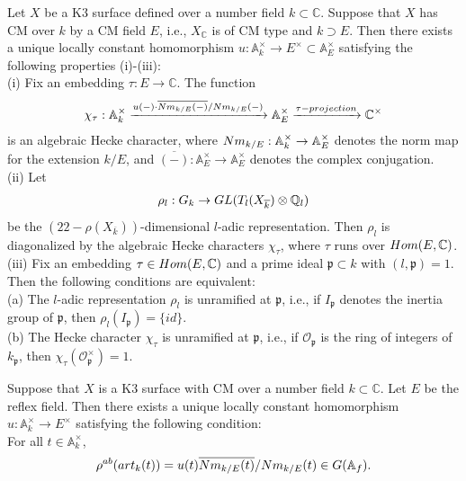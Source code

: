 \documentclass[10pt,a4paper]{amsart}
\begin{document}
    \begin{thm}\label{main theorem} 
        Let $X$ be a K3 surface defined over a number field $k\subset \mathbb{C}$. Suppose that $X$ has CM over $k$ by a  CM field $E$, i.e., $X_{\mathbb{C}}$ is of CM type and $k\supset E$. Then there exists a unique locally constant homomorphism $u : \mathbb{A}^{\times}_{k} \to E^{\times}\subset \mathbb{A}^{\times}_{E}$ satisfying the following properties (i)-(iii):
        \\ \indent (i) Fix an embedding $\tau : E\to \mathbb{C}$. The function \begin{align}
            \chi_{\tau} : \mathbb{A}^{\times}_{k}\xrightarrow{u(-)\cdot \overline{{\rm Nm}_{k/E}(-)}/{\rm Nm}_{k/E}(-)} \mathbb{A}^{\times}_{E}\xrightarrow{\tau-{\rm projection}} \mathbb{C}^{\times}\notag\end{align}
         is an algebraic Hecke character, where ${\rm Nm}_{k/E} : \mathbb{A}^{\times}_{k}\to \mathbb{A}^{\times}_{E}$ denotes the norm map for the extension $k/E$, and $\overline{(-)} : \mathbb{A}^{\times}_{E}\to \mathbb{A}^{\times}_{E}$ denotes the complex conjugation.
        \\\indent (ii) Let \begin{align}\rho_{l} : G_{k}\to GL(T_{l}(X_{\overline{k}})\otimes \mathbb{Q}_{l}) \notag
        \end{align}
    be the $(22-\rho(X_{\overline{k}}))$-dimensional $l$-adic representation. Then $\rho_{l}$ is diagonalized by the algebraic Hecke characters $\chi_{\tau}$, where $\tau$ runs over ${\rm Hom}(E, \mathbb{C})$.
    \\ \indent (iii) Fix an embedding $\tau\in {\rm Hom}(E, \mathbb{C})$ and a prime ideal $\mathfrak{p}\subset k$ with $(l, \mathfrak{p})=1$. Then the following conditions are equivalent: 
     \\(a) The $l$-adic representation $\rho_{l}$ is unramified at $\mathfrak{p}$, i.e., if $I_{\mathfrak{p}}$ denotes the inertia group of $\mathfrak{p}$, then $\rho_{l}(I_{\mathfrak{p}})=\{id\}$.
     \\(b) The Hecke character $\chi_{\tau}$ is unramified at $\mathfrak{p}$, i.e., if $\mathscr{O}_{\mathfrak{p}}$ is the ring of integers of $k_{\mathfrak{p}}$, then  $\chi_{\tau}(\mathscr{O}^{\times}_{\mathfrak{p}})=1.$
       \end{thm}

    \begin{prop}\label{hecke1}
        Suppose that $X$ is a K3 surface with CM over a number field $k\subset \mathbb{C}$. Let $E$ be the reflex field. Then there exists a unique locally constant homomorphism $ u: \mathbb{A}^{\times}_{k}\to E^{\times}$ satisfying the following condition: 
        \\ For all $t\in \mathbb{A}^{\times}_{k}$, 
        \begin{align}
            \rho^{ab}({\rm art}_k(t))=u(t)\overline{{\rm Nm}_{k/E}(t)}/{\rm Nm}_{k/E}(t)\in G(\mathbb{A}_{f})\notag.
        \end{align}
    \end{prop}
\end{document}
